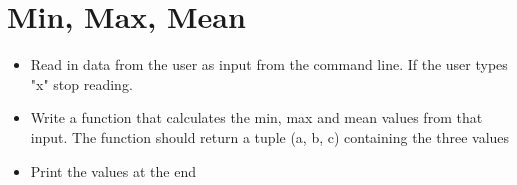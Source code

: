 \section{Min, Max, Mean}

\begin{itemize}
\item Read in data from the user as input from the command line. If the user types "x" stop reading.
\item Write a function that calculates the min, max and mean values from that input. The function should return a tuple (a, b, c) containing the three values
\item Print the values at the end
\end{itemize}

